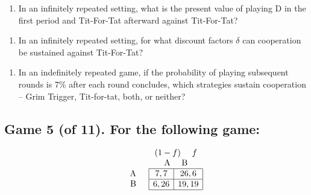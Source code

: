 \documentclass[11pt]{article}
\begin{document}
\vspace{1cm}

\begin{enumerate}[label=\alph*), start=5]
\item  In an infinitely repeated setting, what is the present value of playing D in the first period and Tit-For-Tat afterward against Tit-For-Tat?

\end{enumerate}
\hfill \raisebox{-1ex}{\rule{4.2cm}{1pt}}

\vspace{1cm}

\begin{enumerate}[label=\alph*), start=6]
\item  In an infinitely repeated setting, for what discount factors $\delta$ can cooperation be sustained against Tit-For-Tat? 

\end{enumerate}
\hfill \raisebox{-1ex}{\rule{4.2cm}{1pt}}

\vspace{2cm}

\begin{enumerate}[label=\alph*), start=7]
\item  In an indefinitely repeated game, if the probability of playing subsequent rounds is 7\% after each round concludes, which strategies sustain cooperation – Grim Trigger, Tit-for-tat, both, or neither? 

\end{enumerate}
\hfill \raisebox{-1ex}{\rule{4.2cm}{1pt}}


\pagebreak

\subsection*{Game 5 (of 11). For the following game:
}
$$
\begin{array}{lccc}
    & & & (1-f) \ \ \ \ f\\
    & & & \text{A} \ \ \ \ \text{B}\\
    & &
    \begin{array}{r}
        \text{A} \\
        \text{B} \\
    \end{array} &
    \begin{array}{|c|c|}
        \hline
        7,7 & 26,6 \\
        \hline
        6,26 & 19,19 \\
        \hline
    \end{array}
\end{array}
$$
\end{document}
